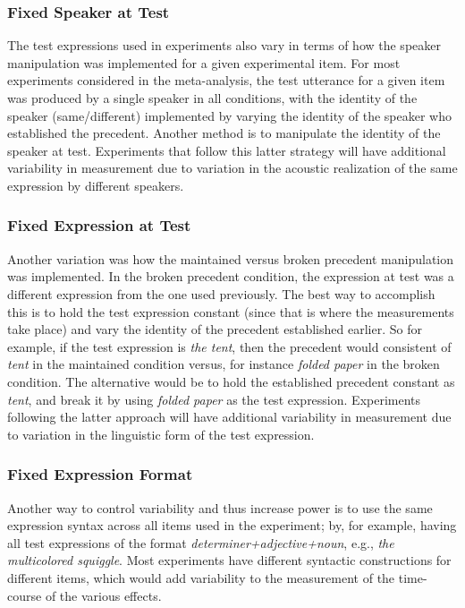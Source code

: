 \documentclass[doc,fignum,apacite,floatsintext]{apa6}
\begin{document}
\subsubsection{Fixed Speaker at Test}
The test expressions used in experiments also vary in terms of how the speaker manipulation was implemented for a given experimental item.  For most experiments considered in the meta-analysis, the test utterance for a given item was produced by a single speaker in all conditions, with the identity of the speaker (same/different) implemented by varying the identity of the speaker who established the precedent.  Another method is to manipulate the identity of the speaker at test.  Experiments that follow this latter strategy will have additional variability in measurement due to variation in the acoustic realization of the same expression by different speakers.

\subsubsection{Fixed Expression at Test}
Another variation was how the maintained versus broken precedent manipulation was implemented.  In the broken precedent condition, the expression at test was a different expression from the one used previously.  The best way to accomplish this is to hold the test expression constant (since that is where the measurements take place) and vary the identity of the precedent established earlier.  So for example, if the test expression is \textit{the tent}, then the precedent would consistent of \textit{tent} in the maintained condition versus, for instance \textit{folded paper} in the broken condition.  The alternative would be to hold the established precedent constant as \textit{tent}, and break it by using \textit{folded paper} as the test expression.  Experiments following the latter approach will have additional variability in measurement due to variation in the linguistic form of the test expression. 

\subsubsection{Fixed Expression Format}
Another way to control variability and thus increase power is to use the same expression syntax across all items used in the experiment; by, for example, having all test expressions of the format \textit{determiner+adjective+noun}, e.g., \textit{the multicolored squiggle}.  Most experiments have different syntactic constructions for different items, which would add variability to the measurement of the time-course of the various effects.
\end{document}
